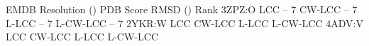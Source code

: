 \bTABLE
\bTABLEhead
\bTR \bTD EMDB \eTD \bTD Resolution (\Angstrom) \eTD \bTD PDB \eTD \bTD Score \eTD \bTD RMSD (\Angstrom) \eTD \bTD Rank \eTD \eTR
\eTABLEhead
\bTABLEbody
\bTR {} \eTD {} \eTD \bTD[nr=4] 3ZPZ:O \eTD \bTD LCC \eTD {} \eTD {} -- 7 \eTD \eTR
\bTR \bTD CW-LCC \eTD {} \eTD {} -- 7 \eTD \eTR
\bTR \bTD L-LCC \eTD {} \eTD {} -- 7 \eTD \eTR
\bTR \bTD L-CW-LCC \eTD {} \eTD {} -- 7 \eTD \eTR
%
\bTR {} \eTD {} \eTD \bTD[nr=4] 2YKR:W \eTD \bTD LCC \eTD {} \eTD {} \eTD \eTR
\bTR \bTD CW-LCC \eTD {} \eTD {} \eTD \eTR
\bTR \bTD L-LCC \eTD {} \eTD {} \eTD \eTR
\bTR \bTD L-CW-LCC \eTD {} \eTD {} \eTD \eTR
%
\bTR {} \eTD {} \eTD \bTD[nr=4] 4ADV:V \eTD \bTD LCC \eTD {} \eTD {} \eTD \eTR
\bTR \bTD CW-LCC \eTD {} \eTD {} \eTD \eTR
\bTR \bTD L-LCC \eTD {} \eTD {} \eTD \eTR
\bTR \bTD L-CW-LCC \eTD {} \eTD {} \eTD \eTR
\eTABLEbody
\eTABLE
\stopbuffer
